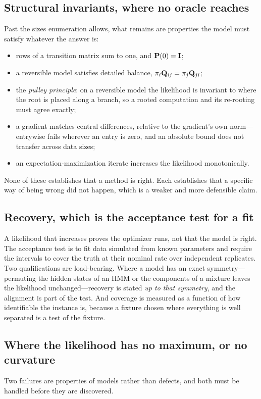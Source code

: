\documentclass[11pt,a4paper]{article}
\begin{document}
\subsection{Structural invariants, where no oracle reaches}
Past the sizes enumeration allows, what remains are properties the model must
satisfy whatever the answer is:
\begin{itemize}
  \item rows of a transition matrix sum to one, and $\mathbf{P}(0) = \mathbf{I}$;
  \item a reversible model satisfies detailed balance, $\pi_i \mathbf{Q}_{ij} = \pi_j \mathbf{Q}_{ji}$;
  \item the \emph{pulley principle}: on a reversible model the likelihood is
        invariant to where the root is placed along a branch, so a rooted
        computation and its re-rooting must agree exactly;
  \item a gradient matches central differences, relative to the gradient's own
        norm---entrywise fails wherever an entry is zero, and an absolute bound
        does not transfer across data sizes;
  \item an expectation-maximization iterate increases the likelihood
        monotonically.
\end{itemize}
None of these establishes that a method is right. Each establishes that a
specific way of being wrong did not happen, which is a weaker and more
defensible claim.

\subsection{Recovery, which is the acceptance test for a fit}
A likelihood that increases proves the optimizer runs, not that the model is
right. The acceptance test is to fit data simulated from known parameters and
require the intervals to cover the truth at their nominal rate over
independent replicates. Two qualifications are load-bearing. Where a model has
an exact symmetry---permuting the hidden states of an HMM or the components of
a mixture leaves the likelihood unchanged---recovery is stated \emph{up to that
symmetry}, and the alignment is part of the test. And coverage is measured as a
function of how identifiable the instance is, because a fixture chosen where
everything is well separated is a test of the fixture.

\subsection{Where the likelihood has no maximum, or no curvature}
Two failures are properties of models rather than defects, and both must be
handled before they are discovered.
\end{document}
